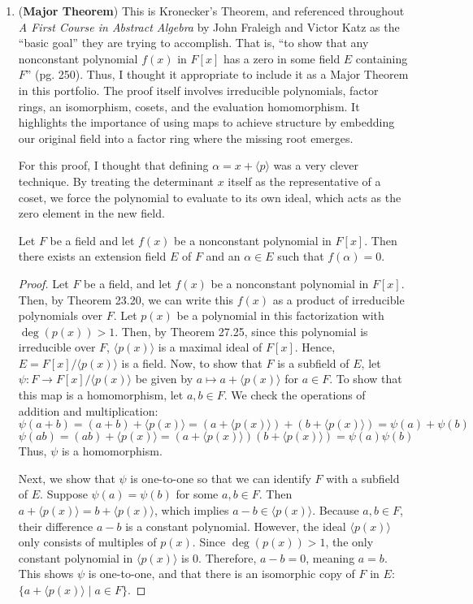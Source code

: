 \documentclass[12pt, oneside]{book}
\newcommand{\pf}[1]{
    \begin{customframedproof}[linecolor=horange!75]
        \begin{proof}
        #1
        \end{proof}
    \end{customframedproof}
}
\newcommand{\gen}[1]{\langle #1 \rangle}
\begin{document}
\begin{enumerate}[label=\textbf{\arabic*.}]
    \item (\textbf{Major Theorem}) This is Kronecker's Theorem, and referenced throughout \textit{A First Course in Abstract Algebra} by John Fraleigh and Victor Katz as the ``basic goal'' they are trying to accomplish. That is, ``to show that any nonconstant polynomial \(f(x)\) in \(F[x]\) has a zero in some field \(E\) containing \(F\)'' (pg. 250). Thus, I thought it appropriate to include it as a Major Theorem in this portfolio. The proof itself involves irreducible polynomials, factor rings, an isomorphism, cosets, and the evaluation homomorphism. It highlights the importance of using maps to achieve structure by embedding our original field into a factor ring where the missing root emerges.
    
    For this proof, I thought that defining \(\alpha = x + \gen{p}\) was a very clever technique. By treating the determinant \(x\) itself as the representative of a coset, we force the polynomial to evaluate to its own ideal, which acts as the zero element in the new field.
    
    Let \(F\) be a field and let \(f(x)\) be a nonconstant polynomial in \(F[x]\). Then there exists an extension field \(E\) of \(F\) and an \(\alpha \in E\) such that \(f(\alpha) = 0\).
    \pf{
        Let \(F\) be a field, and let \(f(x)\) be a nonconstant polynomial in \(F[x]\). Then, by Theorem 23.20, we can write this \(f(x)\) as a product of irreducible polynomials over \(F\). Let \(p(x)\) be a polynomial in this factorization with \(\deg(p(x)) > 1\). Then, by Theorem 27.25, since this polynomial is irreducible over \(F\), \(\gen{p(x)}\) is a maximal ideal of \(F[x]\). Hence, \(E = F[x]/\gen{p(x)}\) is a field. Now, to show that \(F\) is a subfield of \(E\), let \(\psi : F \to F[x]/\gen{p(x)}\) be given by \(a \mapsto a + \gen{p(x)}\) for \(a \in F\). To show that this map is a homomorphism, let \(a,b \in F\). We check the operations of addition and multiplication:
        \[
            \psi(a + b) = (a + b) + \gen{p(x)} = (a + \gen{p(x)}) + (b + \gen{p(x)}) = \psi(a) + \psi(b)
        \]
        \[
            \psi(ab) = (ab) + \gen{p(x)} = (a + \gen{p(x)})(b + \gen{p(x)}) = \psi(a)\psi(b)
        \]
        Thus, \(\psi\) is a homomorphism.
        
        Next, we show that \(\psi\) is one-to-one so that we can identify \(F\) with a subfield of \(E\). Suppose \(\psi(a) = \psi(b)\) for some \(a,b \in F\). Then \(a + \gen{p(x)} = b + \gen{p(x)}\), which implies \(a - b \in \gen{p(x)}\). Because \(a,b \in F\), their difference \(a - b\) is a constant polynomial. However, the ideal \(\gen{p(x)}\) only consists of multiples of \(p(x)\). Since \(\deg(p(x)) > 1\), the only constant polynomial in \(\gen{p(x)}\) is 0. Therefore, \(a - b = 0\), meaning \(a = b\). This shows \(\psi\) is one-to-one, and that there is an isomorphic copy of \(F\) in \(E\): \(\{a + \gen{p(x)} \mid a \in F\}\). 

}
\end{enumerate}
\end{document}

